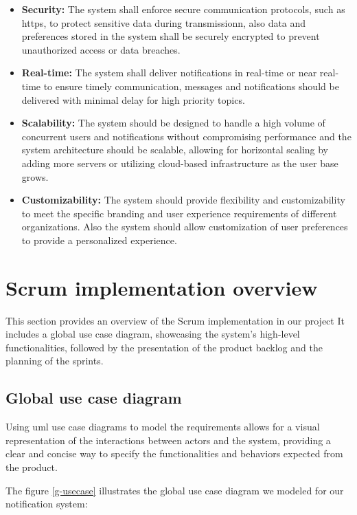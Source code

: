\begin{itemize}
    \item \textbf{Security:} The system shall enforce secure communication protocols, such as \acrshort{https}, 
    to protect sensitive data during transmissionn, also data and preferences stored in the system shall be securely 
    encrypted to prevent unauthorized access or data breaches.
    \item \textbf{Real-time:} The system shall deliver notifications in real-time or near real-time 
    to ensure timely communication, messages and notifications should be delivered with minimal delay for high 
    priority topics.
    \item \textbf{Scalability:} The system should be designed to handle a high volume of concurrent users 
    and notifications without compromising performance and the system architecture should be scalable, allowing for 
    horizontal scaling by adding more servers or utilizing cloud-based infrastructure as the user base grows.
    \item \textbf{Customizability:} The system should provide flexibility and customizability to meet 
    the specific branding and user experience requirements of different organizations. Also the system should 
    allow customization of user preferences to provide a personalized experience.
\end{itemize}

\section{Scrum implementation overview}
\label{spec}
This section provides an overview of the Scrum implementation in our project It includes a global use case diagram, showcasing the system's 
high-level functionalities, followed by the presentation of the product backlog and the planning 
of the sprints.

\subsection{Global use case diagram}
Using \acrshort{uml} use case diagrams to model the requirements allows for a visual representation 
of the interactions between actors and the system, providing a clear and concise way to specify 
the functionalities and behaviors expected from the product.

The figure \ref{g-usecase} illustrates the global use case diagram we modeled for our notification system: \\

